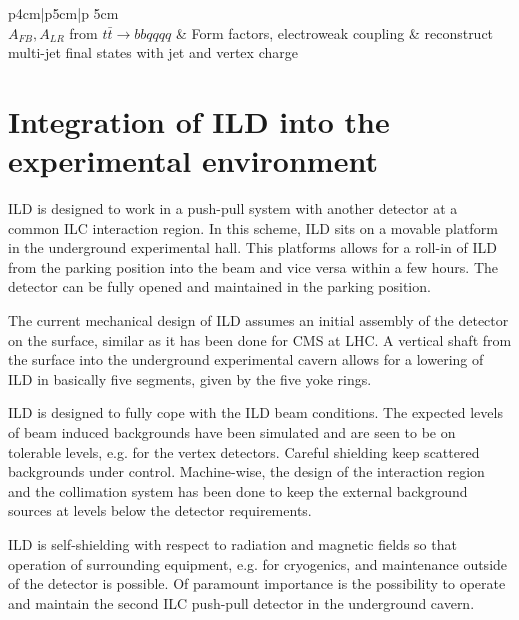 \documentclass[%
 amsmath,amssymb,
 aps,
]{revtex4-1}
\begin{document}
\begin{table}[thb]
\begin{tabular}{p{4cm}|p{5cm}|p {5cm}}
\hline
{}\\
\hline
$A_{FB}, A_{LR}$ from $t \bar t \rightarrow bb qqqq$ & Form factors, electroweak coupling & reconstruct multi-jet final states with jet and vertex charge\\



    \end{tabular}
    \caption{Table of benchmark reactions which are used by ILD to optimize the detector performance. The channel, the physics motivation, and the main detector performance parameters are given.}
    \label{tab-benchmark}
\end{table}
\section{Integration of ILD into the experimental environment}
ILD is designed to work in a push-pull system with another detector at a common ILC interaction region. In this scheme, ILD sits on a movable platform in the underground experimental hall. This platforms allows for a roll-in of ILD from the parking position into the beam and vice versa within a few hours. The detector can be fully opened and maintained in the parking position.

The current mechanical design of ILD assumes an initial assembly of the detector on the surface, similar as it has been done for CMS at LHC. A vertical shaft from the surface into the underground experimental cavern allows for a lowering of ILD in basically five segments, given by the five yoke rings.

ILD is designed to fully cope with the ILD beam conditions. The expected levels of beam induced backgrounds have been simulated and are seen to be on tolerable levels, e.g. for the vertex detectors. Careful shielding keep scattered backgrounds under control. Machine-wise, the design of the interaction region and the collimation system has been done to keep the external background sources at levels below the detector requirements.

ILD is self-shielding with respect to radiation and magnetic fields so that operation of surrounding equipment, e.g. for cryogenics, and maintenance outside of the detector is possible. Of paramount importance is the possibility to operate and maintain the second ILC push-pull detector in the underground cavern.
\end{document}
